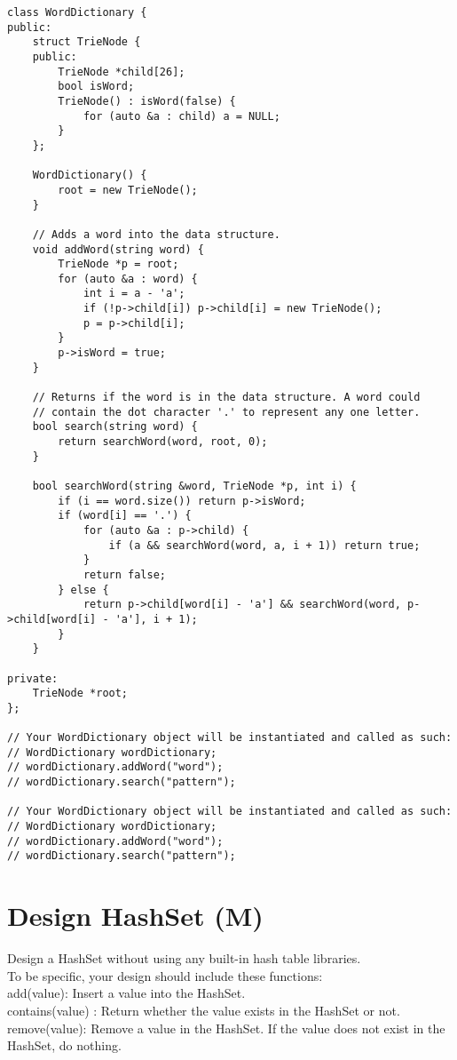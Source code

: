 \begin{lstlisting}
class WordDictionary {
public:
    struct TrieNode {
    public:
        TrieNode *child[26];
        bool isWord;
        TrieNode() : isWord(false) {
            for (auto &a : child) a = NULL;
        }
    };
    
    WordDictionary() {
        root = new TrieNode();
    }
    
    // Adds a word into the data structure.
    void addWord(string word) {
        TrieNode *p = root;
        for (auto &a : word) {
            int i = a - 'a';
            if (!p->child[i]) p->child[i] = new TrieNode();
            p = p->child[i];
        }
        p->isWord = true;
    }

    // Returns if the word is in the data structure. A word could
    // contain the dot character '.' to represent any one letter.
    bool search(string word) {
        return searchWord(word, root, 0);
    }
    
    bool searchWord(string &word, TrieNode *p, int i) {
        if (i == word.size()) return p->isWord;
        if (word[i] == '.') {
            for (auto &a : p->child) {
                if (a && searchWord(word, a, i + 1)) return true;
            }
            return false;
        } else {
            return p->child[word[i] - 'a'] && searchWord(word, p->child[word[i] - 'a'], i + 1);
        }
    }
    
private:
    TrieNode *root;
};

// Your WordDictionary object will be instantiated and called as such:
// WordDictionary wordDictionary;
// wordDictionary.addWord("word");
// wordDictionary.search("pattern");

// Your WordDictionary object will be instantiated and called as such:
// WordDictionary wordDictionary;
// wordDictionary.addWord("word");
// wordDictionary.search("pattern");
\end{lstlisting}

\section{Design HashSet (M)}
Design a HashSet without using any built-in hash table libraries.\\

To be specific, your design should include these functions:\\

    add(value): Insert a value into the HashSet. \\
    contains(value) : Return whether the value exists in the HashSet or not.\\
    remove(value): Remove a value in the HashSet. If the value does not exist in the HashSet, do nothing.\\

